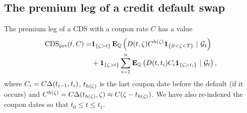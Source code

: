 \subsection{The premium leg of a credit default swap}

The premium leg of a CDS with a coupon rate $C$ has a value
\begin{align}
\operatorname{\mathrm{CDS_{pre}}}(t, C) = &\boldsymbol{1}_{ \{ \zeta > t \} } \operatorname{\boldsymbol{\mathrm{E}}}_{\mathbb{Q}} \left( D(t,\zeta) C^{h(\zeta)} \boldsymbol{1}_{ \{ S < \zeta < T \} } \ | \ \mathcal{G}_t \right) \\
	&+ \boldsymbol{1}_{ \{ \zeta > t \} } \sum_{i=1}^n \operatorname{\boldsymbol{\mathrm{E}}}_{\mathbb{Q}} \left( D(t,t_i) C_i \boldsymbol{1}_{ \{ \zeta > t_i \} } \ | \ \mathcal{G}_t \right) ,
\end{align}
where $C_i = C \Delta (t_{i-1}, t_i)$, $t_{h(\zeta)}$ is the last coupon date before the default (if it occurs) and $C^{h(\zeta)} = C \Delta (t_{h(\zeta)}, \zeta) \approx C(\zeta - t_{h(\zeta)})$. We have also re-indexed the coupon dates so that $t_0 \leq t \leq t_1$.

